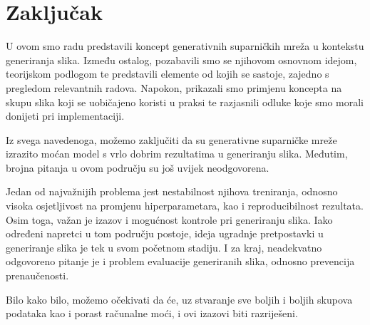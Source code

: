 \chapter{Zaključak}
U ovom smo radu predstavili koncept generativnih suparničkih mreža u kontekstu generiranja slika. Između ostalog, pozabavili smo se njihovom osnovnom idejom, teorijskom podlogom te predstavili elemente od kojih se sastoje, zajedno s pregledom relevantnih radova. Napokon, prikazali smo primjenu koncepta na skupu slika koji se uobičajeno koristi u praksi te razjasnili odluke koje smo morali donijeti pri implementaciji.

Iz svega navedenoga, možemo zaključiti da su generativne suparničke mreže izrazito moćan model s vrlo dobrim rezultatima u generiranju slika. Međutim, brojna pitanja u ovom području su još uvijek neodgovorena.

Jedan od najvažnijih problema jest nestabilnost njihova treniranja, odnosno visoka osjetljivost na promjenu hiperparametara, kao i reproducibilnost rezultata. Osim toga, važan je izazov i mogućnost kontrole pri generiranju slika. Iako određeni napretci u tom području postoje, ideja ugradnje pretpostavki u generiranje slika je tek u svom početnom stadiju. I za kraj, neadekvatno odgovoreno pitanje je i problem evaluacije generiranih slika, odnosno prevencija prenaučenosti. 

Bilo kako bilo, možemo očekivati da će, uz stvaranje sve boljih i boljih skupova podataka kao i porast računalne moći, i ovi izazovi  biti razriješeni. 
